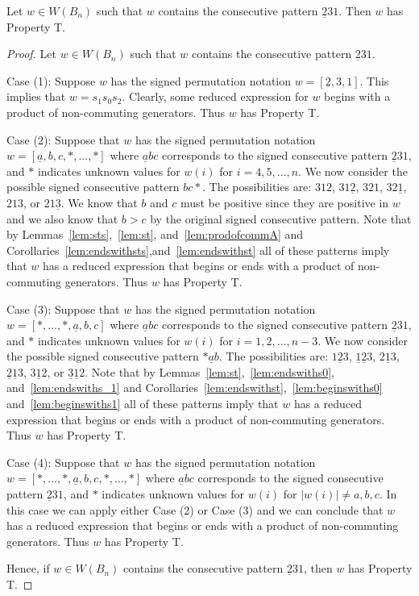 \begin{lemma}\label{lem:231}
Let $w \in W(B_n)$ such that $w$ contains the consecutive pattern $\underline{2}31$. Then $w$ has Property T.
\begin{proof}
	Let $w \in W(B_n)$ such that $w$ contains the consecutive pattern $\underline{2}31$.
	
	Case (1): Suppose $w$ has the signed permutation notation $w=[\underline{2},3,1]$. This implies that $w=s_1s_0s_2$. Clearly, some reduced expression for $w$ begins with a product of non-commuting generators. Thus $w$ has Property T.
	
	Case (2): Suppose that $w$ has the signed permutation notation $w=[\underline{a},b,c, \ast, \ldots, \ast]$ where $\underline{a}bc$ corresponds to the signed consecutive pattern $\underline{2}31$, and $\ast$ indicates unknown values for $w(i)$ for $i=4,5, \ldots, n$. We now consider the possible signed consecutive pattern $bc \ast$. The possibilities are: $312$, $31\underline{2}$, $321$, $32\underline{1}$, $213$, or $21\underline{3}$. We know that $b$ and $c$ must be positive since they are positive in $w$ and we also know that $b>c$ by the original signed consecutive pattern. Note that by Lemmas~\ref{lem:sts},~\ref{lem:st}, and~\ref{lem:prodofcommA} and Corollaries~\ref{lem:endswithsts},and~\ref{lem:endswithst} all of these patterns imply that $w$ has a reduced expression that begins or ends with a product of non-commuting generators. Thus $w$ has Property T.
	
	Case (3): Suppose that $w$ has the signed permutation notation $w=[\ast, \ldots, \ast, \underline{a},b,c]$ where $\underline{a}bc$ corresponds to the signed consecutive pattern $\underline{2}31$, and $\ast$ indicates unknown values for $w(i)$ for $i=1,2, \ldots ,n-3$. We now consider the possible signed consecutive pattern $\ast \underline{a}b$. The possibilities are: $1 \underline{2} 3$, $\underline{1} \underline{2}3$, $2 \underline{1} 3$, $\underline{2} \underline{1} 3$, $3 \underline{1} 2$, or $\underline{3} \underline{1} 2$. Note that by Lemmas~\ref{lem:st},~\ref{lem:endswiths0}, and~\ref{lem:endswiths_1} and Corollaries~\ref{lem:endswithst},~\ref{lem:beginswiths0} and~\ref{lem:beginswiths1} all of these patterns imply that $w$ has a reduced expression that begins or ends with a product of non-commuting generators. Thus $w$ has Property T. 
	
	Case (4): Suppose that $w$ has the signed permutation notation $w=[\ast, \ldots, \ast, \underline{a},b,c, \ast, \ldots, \ast]$ where $\underline{a}bc$ corresponds to the signed consecutive pattern $\underline{2}31$, and $\ast$ indicates unknown values for $w(i)$ for $|w(i)|\neq a,b,c$. In this case we can apply either Case (2) or Case (3) and we can conclude that $w$ has a reduced expression that begins or ends with a product of non-commuting generators. Thus $w$ has Property T.

	Hence, if $w \in W(B_n)$ contains the consecutive pattern $\underline{2}31$, then $w$ has Property T.
\end{proof}	
\end{lemma}

